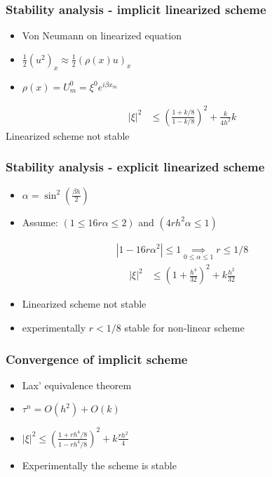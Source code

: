 \documentclass[screen]{beamer}
\begin{document}
\begin{frame}

\frametitle{Stability analysis - implicit linearized scheme}
\begin{itemize}
\item Von Neumann on linearized equation \\
\item $\frac{1}{2}(u^2)_x \approx \frac{1}{2}(\rho(x)u)_x$ \\
\item $\rho(x) = U^0_m = \xi^0 e^{i\beta x_m}$ 
\end{itemize}


\begin{align*}
|\xi |^2 &\le \left(\frac{1+k/8}{1-k/8}\right)^2 + \frac{k}{4h^2}k
\end{align*}
Linearized scheme not stable

\end{frame}


\begin{frame}
\frametitle{Stability analysis - explicit linearized scheme}

\begin{itemize}
\item $\alpha = \sin^2(\frac{\beta h}{2})$
\item Assume: $(1 \le 16r\alpha \le 2)$ and $(4rh^2\alpha \le 1)$
\end{itemize}

\begin{align*}
 \left| 1-16r\alpha^2\right| \le 1 \underset{0\le \alpha\le 1}{\implies}  r \le 1/8 
\end{align*} 
\begin{align*}
|\xi |^2 &\le \left(1 + \frac{h^4}{32}\right)^2 + k\frac{h^2}{32} 
\end{align*}

\begin{itemize}
\item Linearized scheme not stable
\item experimentally $r < 1/8$ stable for non-linear scheme
\end{itemize}
\end{frame}


\begin{frame}
\frametitle{Convergence of implicit scheme}

\begin{itemize}
\item Lax' equivalence theorem
\item $\tau ^n = O(h^2) + O(k) $
\item $|\xi |^2 \le \left(\frac{1+rh^4/8}{1-rh^4/8}\right)^2 + k\frac{rh^2}{4}$
\item Experimentally the scheme is stable
\end{itemize}

\end{frame}
\end{document}
